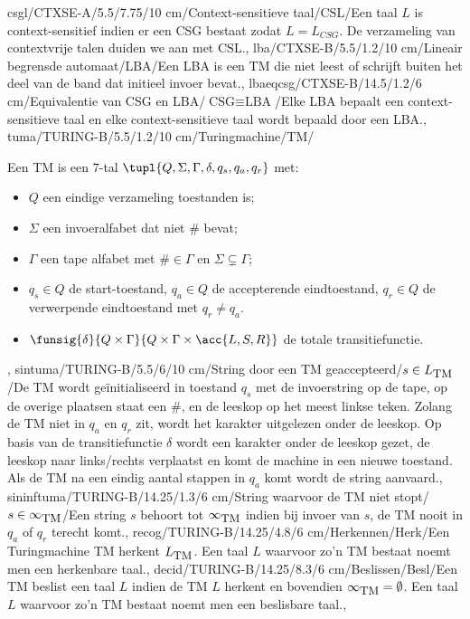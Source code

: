 csgl/CTXSE-A/5.5/7.75/10 cm/Context-sensitieve taal/$\mbox{CSL}$/{Een taal $L$ is context-sensitief indien er een CSG bestaat zodat $L=L_{CSG}$. De verzameling van contextvrije talen duiden we aan met $\mbox{CSL}$.},
lba/CTXSE-B/5.5/1.2/10 cm/Lineair begrensde automaat/$\mbox{LBA}$/{Een LBA is een TM die niet leest of schrijft buiten het deel van de band dat initieel invoer bevat.},
lbaeqcsg/CTXSE-B/14.5/1.2/6 cm/Equivalentie van CSG en LBA/$\mbox{CSG}\equiv\mbox{LBA}$/{Elke LBA bepaalt een context-sensitieve taal en elke context-sensitieve taal wordt bepaald door een LBA.},
tuma/TURING-B/5.5/1.2/10 cm/Turingmachine/TM/{Een TM is een $7$-tal $\tupl{Q,\Sigma,\Gamma,\delta,q_s,q_a,q_r}$ met:\begin{itemize}\item $Q$ een eindige verzameling toestanden is;\item $\Sigma$ een invoeralfabet dat niet $\#$ bevat;\item $\Gamma$ een tape alfabet met $\#\in\Gamma$ en $\Sigma\subsetneq\Gamma$;\item $q_s\in Q$ de start-toestand, $q_a\in Q$ de accepterende eindtoestand, $q_r\in Q$ de verwerpende eindtoestand met $q_r\neq q_a$.\item $\funsig{\delta}{Q\times\Gamma}{Q\times\Gamma\times\acc{L,S,R}}$ de totale transitiefunctie.\end{itemize}},
sintuma/TURING-B/5.5/6/10 cm/String door een TM geaccepteerd/$s\in L_{\mbox{\small TM}}$/{De TM wordt ge\"initialiseerd in toestand $q_s$ met de invoerstring op de tape, op de overige plaatsen staat een $\#$, en de leeskop op het meest linkse teken. Zolang de TM niet in $q_a$ en $q_r$ zit, wordt het karakter uitgelezen onder de leeskop. Op basis van de transitiefunctie $\delta$ wordt een karakter onder de leeskop gezet, de leeskop naar links/rechts verplaatst en komt de machine in een nieuwe toestand. Als de TM na een eindig aantal stappen in $q_a$ komt wordt de string aanvaard.},
sininftuma/TURING-B/14.25/1.3/6 cm/String waarvoor de TM niet stopt/$s\in\infty_{\mbox{\small TM}}$/{Een string $s$ behoort tot $\infty_{\mbox{\small TM}}$ indien bij invoer van $s$, de TM nooit in $q_a$ of $q_r$ terecht komt.},
recog/TURING-B/14.25/4.8/6 cm/Herkennen/Herk/{Een Turingmachine TM herkent $L_{\mbox{\small TM}}$. Een taal $L$ waarvoor zo'n TM bestaat noemt men een herkenbare taal.},
decid/TURING-B/14.25/8.3/6 cm/Beslissen/Besl/{Een TM beslist een taal $L$ indien de TM $L$ herkent en bovendien $\infty_{\mbox{\small TM}}=\emptyset$. Een taal $L$ waarvoor zo'n TM bestaat noemt men een beslisbare taal.},
